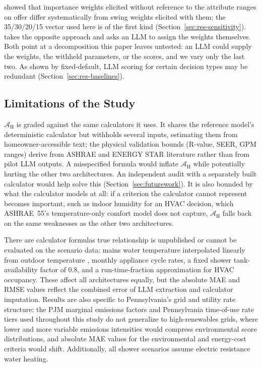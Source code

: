 \documentclass[final,3p,times]{elsarticle}
\begin{document}
 \citet{vonnitzsch1993} showed that importance weights elicited without reference to the attribute ranges on offer differ systematically from swing weights elicited with them; the 35/30/20/15 vector used here is of the first kind  (Section~\ref{sec:res-sensitivity}). \citet{vahidnia2025walmas} takes the opposite approach and asks an LLM to assign the weights themselves. Both point at a decomposition this paper leaves untested: an LLM could supply the weights, the withheld parameters, or the scores, and we vary only the last two. As shown by fixed-default, LLM scoring for certain decision types may be redundant (Section~\ref{sec:res-baselines}).
\FloatBarrier
\subsection{Limitations of the Study}
\label{sec:limitations}

$\mathcal{A}_{\text{H}}$ is graded against the same calculators it uses. It shares the reference model's deterministic calculator but withholds several inputs, estimating them from homeowner-accessible text; the physical validation bounds (R-value, SEER, GPM ranges) derive from ASHRAE and ENERGY STAR literature rather than from pilot LLM outputs. A misspecified formula would inflate $\mathcal{A}_{\text{H}}$ while potentially hurting the other two architectures. An independent audit with a separately built calculator would help solve this (Section~\ref{sec:futurework}). It is also bounded by what the calculator models at all: if a criterion the calculator cannot represent becomes important, such as indoor humidity for an HVAC decision, which ASHRAE~55's temperature-only comfort model does not capture, $\mathcal{A}_{\text{H}}$ falls back on the same weaknesses as the other two architectures.

\label{sec:calculator-simplifications}
There are calculator formulas true relationship is unpublished or cannot be evaluated on the scenario data: mains water temperature interpolated linearly from outdoor temperature \cite{burch2007}, monthly appliance cycle rates, a fixed shower tank-availability factor of 0.8, and a run-time-fraction approximation for HVAC occupancy. These affect all architectures equally, but the absolute MAE and RMSE values reflect the combined error of LLM extraction and calculator imputation. Results are also specific to Pennsylvania's grid and utility rate structure: the PJM marginal emissions factors and Pennsylvania time-of-use rate tiers used throughout this study do not generalize to high-renewables grids, where lower and more variable emissions intensities would compress environmental score distributions, and absolute MAE values for the environmental and energy-cost criteria would shift. Additionally, all shower scenarios assume electric resistance water heating.
\end{document}
